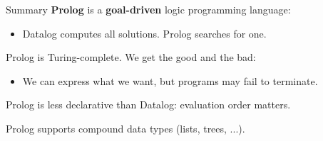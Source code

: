 \begin{frame}{Summary}
\textbf{Prolog} is a \textbf{goal-driven} logic programming language:
%
\begin{itemize}
    \item Datalog computes all solutions. Prolog searches for one. 
\end{itemize}

\pause 

Prolog is Turing-complete. We get the good and the bad: 
%
\begin{itemize}
    \item We can express what we want, but programs may fail to terminate.
\end{itemize}

\pause 

Prolog is less declarative than Datalog: evaluation order matters.

\pause 

Prolog supports compound data types (lists, trees, ...).
\end{frame}
    
    
\begin{frame}[standout]
\end{frame}


